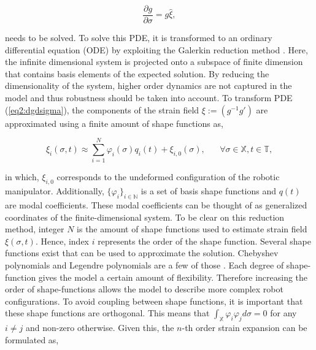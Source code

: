 \begin{equation}
    \frac{\partial g}{\partial \sigma} = g \hat{\xi},
    \label{eq2:dgdsigma}
\end{equation}

needs to be solved. To solve this PDE, it is transformed to an ordinary differential equation (ODE) by exploiting the Galerkin reduction method 
\cite{Galerkin}. Here, the infinite dimensional system is projected onto a subspace of finite dimension that contains basis elements of the expected solution. By reducing the dimensionality of the system, higher order dynamics are not captured in the model and thus robustness should be taken into account. To transform PDE (\ref{eq2:dgdsigma}), the components of the strain field $\xi := (g^{-1}g')$ are approximated using a finite amount of shape functions as,

\begin{equation}
    \xi_i(\sigma,t) \approx \sum_{i=1}^N \varphi_i(\sigma)q_i(t) + \xi_{i,0}(\sigma), \hspace{20pt} \forall \sigma \in \mathbb{X}, t \in \mathbb{T},
\end{equation}

in which, $\xi_{i,0}$ corresponds to the undeformed configuration of the robotic manipulator. Additionally, $\{\varphi_i\}_{i \in \mathbb{N}}$ is a set of basis shape functions and $q(t)$ are modal coefficients. These modal coefficients can be thought of as generalized coordinates of the finite-dimensional system. To be clear on this reduction method, integer $N$ is the amount of shape functions used to estimate strain field $\xi(\sigma,t)$. Hence, index $i$ represents the order of the shape function. Several shape functions exist that can be used to approximate the solution. Chebyshev polynomials and Legendre polynomials are a few of those \cite{Galerkin}. Each degree of shape-function gives the model a certain amount of flexibility. Therefore increasing the order of shape-functions allows the model to describe more complex robot configurations. To avoid coupling between shape functions,  it is important that these shape functions are orthogonal. This means that $\int_\mathbb{X} \varphi_i \varphi_j d \sigma = 0$ for any $i \neq j$ and non-zero otherwise. Given this, the $n$-th order strain expansion can be formulated as,


